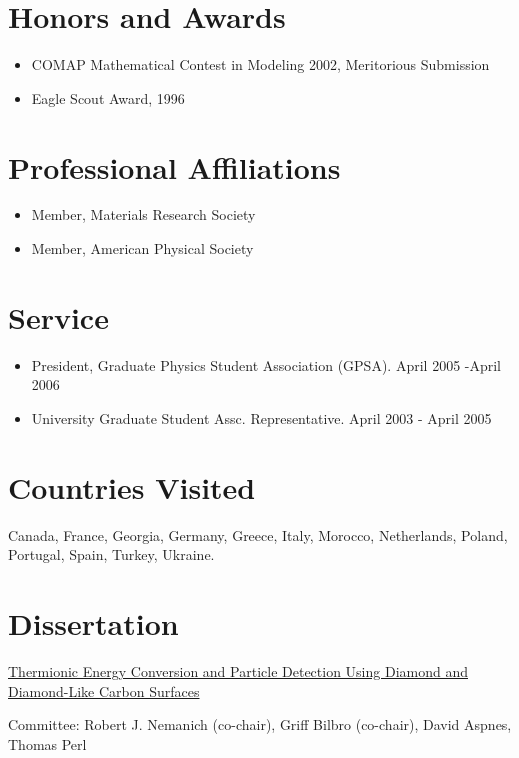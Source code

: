 \section{Honors and Awards}

\begin{itemize}
\item
  COMAP Mathematical Contest in Modeling 2002, Meritorious Submission
\item
  Eagle Scout Award, 1996
\end{itemize}

\section{Professional Affiliations}

\begin{itemize}
\item
  Member, Materials Research Society
\item
  Member, American Physical Society
\end{itemize}

\section{Service}

\begin{itemize}
\item
  President, Graduate Physics Student Association (GPSA). April 2005
  -April 2006
\item
  University Graduate Student Assc. Representative. April 2003 - April
  2005
\end{itemize}

\section{Countries Visited}

Canada, France, Georgia, Germany, Greece, Italy, Morocco, Netherlands,
Poland, Portugal, Spain, Turkey, Ukraine.

\section{Dissertation}

\href{http://www.lib.ncsu.edu/resolver/1840.16/3107}{Thermionic Energy
Conversion and Particle Detection Using Diamond and Diamond-Like Carbon
Surfaces}

Committee: Robert J. Nemanich (co-chair), Griff Bilbro (co-chair), David
Aspnes, Thomas Perl

